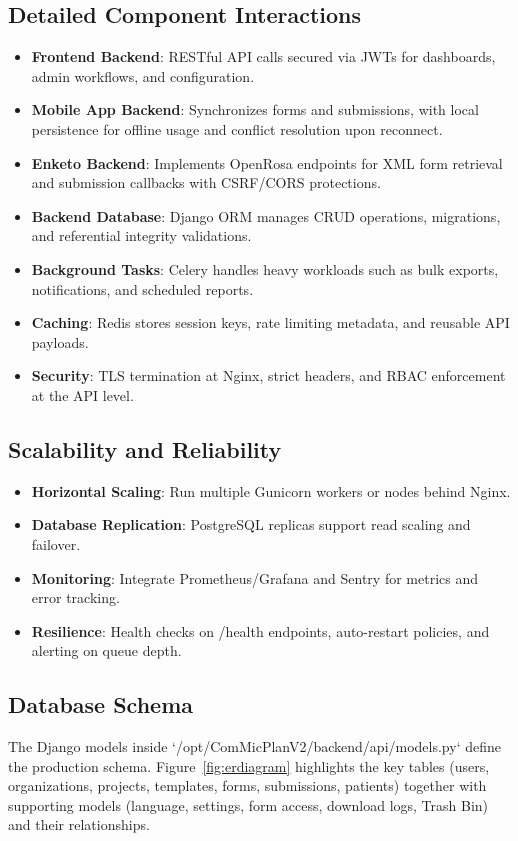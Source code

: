 \documentclass[11pt]{article}
\begin{document}
\subsection{Detailed Component Interactions}
\begin{itemize}[leftmargin=*]
  \item \textbf{Frontend \textrightarrow{} Backend}: RESTful API calls secured via JWTs for dashboards, admin workflows, and configuration.
  \item \textbf{Mobile App \textrightarrow{} Backend}: Synchronizes forms and submissions, with local persistence for offline usage and conflict resolution upon reconnect.
  \item \textbf{Enketo \textrightarrow{} Backend}: Implements OpenRosa endpoints for XML form retrieval and submission callbacks with CSRF/CORS protections.
  \item \textbf{Backend \textrightarrow{} Database}: Django ORM manages CRUD operations, migrations, and referential integrity validations.
  \item \textbf{Background Tasks}: Celery handles heavy workloads such as bulk exports, notifications, and scheduled reports.
  \item \textbf{Caching}: Redis stores session keys, rate limiting metadata, and reusable API payloads.
  \item \textbf{Security}: TLS termination at Nginx, strict headers, and RBAC enforcement at the API level.
\end{itemize}

\subsection{Scalability and Reliability}
\begin{itemize}[leftmargin=*]
  \item \textbf{Horizontal Scaling}: Run multiple Gunicorn workers or nodes behind Nginx.
  \item \textbf{Database Replication}: PostgreSQL replicas support read scaling and failover.
  \item \textbf{Monitoring}: Integrate Prometheus/Grafana and Sentry for metrics and error tracking.
  \item \textbf{Resilience}: Health checks on /health endpoints, auto-restart policies, and alerting on queue depth.
\end{itemize}

\subsection{Database Schema}
The Django models inside `/opt/ComMicPlanV2/backend/api/models.py` define the production schema. Figure~\ref{fig:erdiagram} highlights the key tables (users, organizations, projects, templates, forms, submissions, patients) together with supporting models (language, settings, form access, download logs, Trash Bin) and their relationships.
\end{document}
